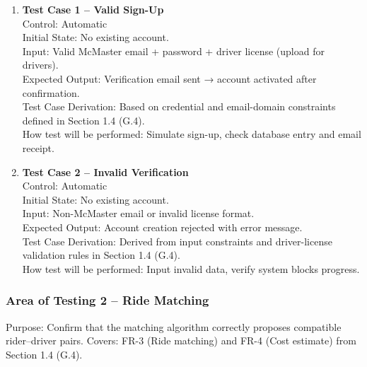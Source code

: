 \documentclass[12pt, titlepage]{article}
\begin{document}
\begin{enumerate}
\item \textbf{Test Case 1 – Valid Sign-Up}\\
Control: Automatic\\
Initial State: No existing account.\\
Input: Valid McMaster email + password + driver license (upload for drivers).\\
Expected Output: Verification email sent → account activated after confirmation.\\
Test Case Derivation: Based on credential and email-domain constraints defined in Section 1.4 (G.4).\\
How test will be performed: Simulate sign-up, check database entry and email receipt.\\[5pt]

\item \textbf{Test Case 2 – Invalid Verification}\\
Control: Automatic\\
Initial State: No existing account.\\
Input: Non-McMaster email or invalid license format.\\
Expected Output: Account creation rejected with error message.\\
Test Case Derivation: Derived from input constraints and driver-license validation rules in Section 1.4 (G.4).\\
How test will be performed: Input invalid data, verify system blocks progress.\\
\end{enumerate}

\subsubsection{Area of Testing 2 – Ride Matching}

Purpose: Confirm that the matching algorithm correctly proposes compatible rider–driver pairs.  
Covers: FR-3 (Ride matching) and FR-4 (Cost estimate) from Section 1.4 (G.4).
\end{document}
